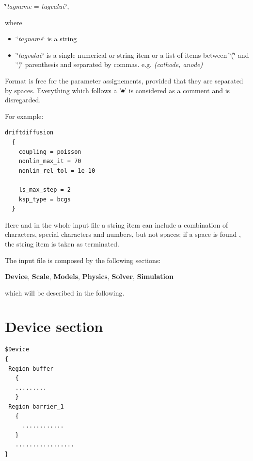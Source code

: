  \char`\"{}\textit{tagname} = \textit{tagvalue}\char`\"{}, 

where

\begin{itemize}
 \item \char`\"{}\textit{tagname}\char`\"{} is a string
\item \char`\"{}\textit{tagvalue}\char`\"{} is a single numerical or string item or a list of items between \char`\"{}(\char`\"{} and \char`\"{})\char`\"{} parenthesis and separated by commas.
e.g. \textit{(cathode, anode)} 
\end{itemize}

Format is free for the parameter   assignements, provided that they are separated by spaces. Everything which follows a '\texttt{\#}' is considered as a comment and is disregarded.

For example:
\begin{verbatim}
driftdiffusion
  {
    coupling = poisson
    nonlin_max_it = 70
    nonlin_rel_tol = 1e-10
   
    ls_max_step = 2
    ksp_type = bcgs
  }
\end{verbatim}
 Here and in the whole input file a string item can include a combination of characters, special characters and numbers, but not spaces; if a space is found , the string item is taken as terminated.
 
  

\vspace{0.5cm}

The input file is composed by  the following sections:

\textbf{Device},  \textbf{Scale},  \textbf{Models},  \textbf{Physics},  \textbf{Solver},   \textbf{Simulation} 

which will be  described  in the following.


\section{Device section }\label{Device}
\begin{verbatim}
$Device
{
 Region buffer
   {
   .........
   }
 Region barrier_1
   {
     ............
   }
   .................
}


\end{verbatim}


